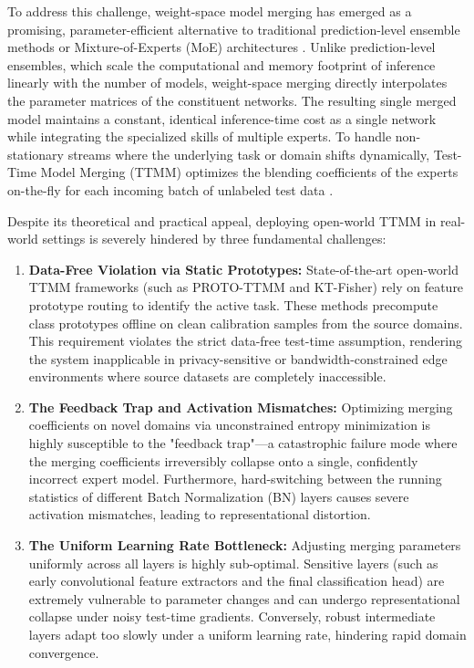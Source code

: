 \documentclass{article}
\theoremstyle{plain}
\theoremstyle{definition}
\theoremstyle{remark}
\begin{document}
To address this challenge, weight-space model merging has emerged as a promising, parameter-efficient alternative to traditional prediction-level ensemble methods or Mixture-of-Experts (MoE) architectures \cite{Ilharco2023, Matena2022}. Unlike prediction-level ensembles, which scale the computational and memory footprint of inference linearly with the number of models, weight-space merging directly interpolates the parameter matrices of the constituent networks. The resulting single merged model maintains a constant, identical inference-time cost as a single network while integrating the specialized skills of multiple experts. To handle non-stationary streams where the underlying task or domain shifts dynamically, Test-Time Model Merging (TTMM) optimizes the blending coefficients of the experts on-the-fly for each incoming batch of unlabeled test data \cite{Yang2024}.

Despite its theoretical and practical appeal, deploying open-world TTMM in real-world settings is severely hindered by three fundamental challenges:
\begin{enumerate}
    \item \textbf{Data-Free Violation via Static Prototypes:} State-of-the-art open-world TTMM frameworks (such as PROTO-TTMM and KT-Fisher) rely on feature prototype routing to identify the active task. These methods precompute class prototypes offline on clean calibration samples from the source domains. This requirement violates the strict data-free test-time assumption, rendering the system inapplicable in privacy-sensitive or bandwidth-constrained edge environments where source datasets are completely inaccessible.
    \item \textbf{The Feedback Trap and Activation Mismatches:} Optimizing merging coefficients on novel domains via unconstrained entropy minimization is highly susceptible to the "feedback trap"—a catastrophic failure mode where the merging coefficients irreversibly collapse onto a single, confidently incorrect expert model. Furthermore, hard-switching between the running statistics of different Batch Normalization (BN) layers causes severe activation mismatches, leading to representational distortion.
    \item \textbf{The Uniform Learning Rate Bottleneck:} Adjusting merging parameters uniformly across all layers is highly sub-optimal. Sensitive layers (such as early convolutional feature extractors and the final classification head) are extremely vulnerable to parameter changes and can undergo representational collapse under noisy test-time gradients. Conversely, robust intermediate layers adapt too slowly under a uniform learning rate, hindering rapid domain convergence.
\end{enumerate}
\end{document}
